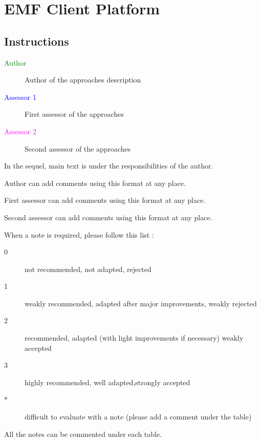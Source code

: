 \chapter{EMF Client Platform}
\label{sec:emfclientplatform}

\section{Instructions}

\begin{description}
\item[\textcolor{green}{Author}] Author of the approaches description  
\item[\textcolor{blue}{Assessor 1}] First assessor of the approaches 
\item[\textcolor{magenta}{Assessor 2}] Second assessor of the approaches 
\end{description}

In the sequel, main text is under the responsibilities of the author.

\begin{author_comment}
Author can add comments using this format at any place.
\end{author_comment}

\begin{assessor1}
First assessor can add comments using this format at any place.
\end{assessor1}

\begin{assessor2}
Second assessor can add comments using this format at any place.
\end{assessor2}

When a note is required, please follow this list :
\begin{description}
\item[0] not recommended, not adapted, rejected
\item[1] weakly recommended, adapted after major improvements, weakly rejected
\item[2] recommended, adapted (with light improvements if necessary)  weakly accepted
\item[3] highly recommended, well adapted,strongly accepted
\item[*] difficult to evaluate with a note (please add a comment under the table)
\end{description}

All the notes can be commented under each table.

